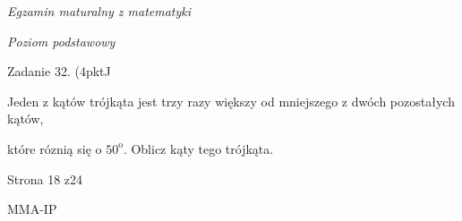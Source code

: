 \documentclass[a4paper,12pt]{article}
\begin{document}
{\it Egzamin maturalny z matematyki}

{\it Poziom podstawowy}

Zadanie 32. (4pktJ

Jeden z kątów trójkąta jest trzy razy większy od mniejszego z dwóch pozostałych kątów,

które róznią się o $50^{\mathrm{o}}$. Oblicz kąty tego trójkąta.

Strona 18 z24

MMA-IP
\end{document}
